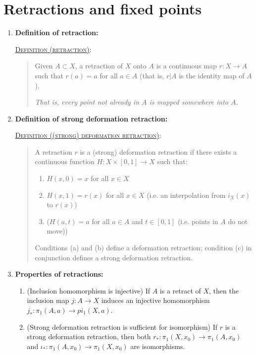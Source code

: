 \documentclass[letterpaper, 12pt]{book}
\newcommand{\defn}[2]{\textsc{\underline{Definition (#1)}:}\begin{quote} #2\end{quote}}
\begin{document}
\section{Retractions and fixed points}
    \begin{enumerate}[resume]
    \item \textbf{Definition of retraction:}

        \defn{retraction}{Given $A\subset X$, a retraction of $X$ onto $A$ is a continuous map $r:X\to A$ such that $r(a)=a$ for all $a\in A$ (that is, $r|A$ is the identity map of $A$).

        \textit{That is, every point not already in $A$ is mapped somewhere into $A$.}}
    \item \textbf{Definition of strong deformation retraction:}

        \defn{(strong) deformation retraction}{A retraction $r$ is a (strong) deformation retraction if there exists a continuous function $H : X\times[0,1]\to X$ such that:
            \begin{enumerate}
            \item $H(x,0) = x$ for all $x\in X$
            \item $H(x,1) = r(x)$ for all $x\in X$ (i.e. an interpolation from $i_X(x)$ to $r(x)$)
            \item ($H(a,t) = a$ for all $a\in A$ and $t\in [0,1]$ (i.e. points in $A$ do not move))
            \end{enumerate}
            Conditions (a) and (b) define a deformation retraction; condition (c) in conjunction defines a strong deformation retraction.}
    \item \textbf{Properties of retractions:}
        \begin{enumerate}
        \item (Inclusion homomorphism is injective) If $A$ is a retract of $X$, then the inclusion map $j:A\to X$ induces an injective homomorphism $j_* : \pi_1(A,a) \to pi_1(X,a)$.
        \item (Strong deformation retraction is sufficient for isomorphism) If $r$ is a strong deformation retraction, then both $r_* : \pi_1(X, x_0) \to \pi_1(A, x_0)$ and $\iota_* : \pi_1(A, x_0) \to \pi_1(X, x_0)$ are isomorphisms.


\end{enumerate}
\end{enumerate}
\end{document}
